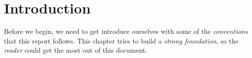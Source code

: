 \documentclass[../../main]{subfiles}
\begin{document}
\section{Introduction} \label{sec:}

Before we begin, we need to get introduce ourselves with some of the \emph{conventions} that this
report follows. This chapter tries to build a \emph{strong foundation}, so the \emph{reader} could
get the most out of this document.
\end{document}
